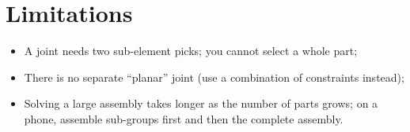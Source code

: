 \section{Limitations}

\begin{itemize}
  \item A joint needs two sub-element picks; you cannot select a whole part;
  \item There is no separate ``planar'' joint (use a combination of constraints instead);
  \item Solving a large assembly takes longer as the number of parts grows; on a phone, assemble sub-groups
        first and then the complete assembly.
\end{itemize}
